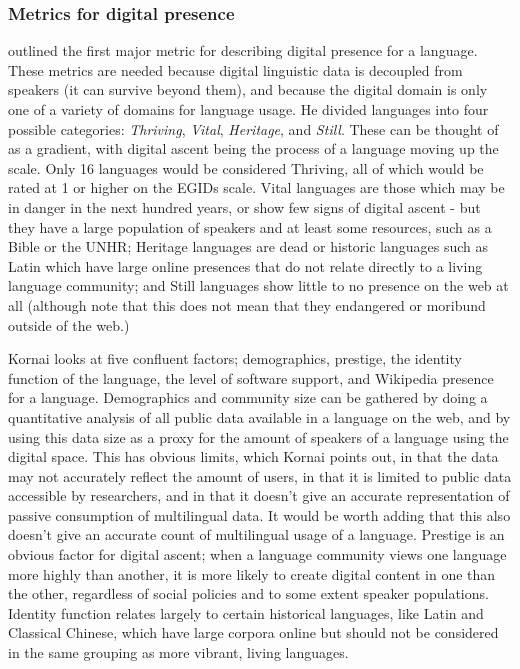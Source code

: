 \subsubsection{Metrics for digital presence}

\citet{kornai2013digital} outlined the first major metric for describing digital presence for a language. These metrics are needed because digital linguistic data is decoupled from speakers (it can survive beyond them), and because the digital domain is only one of a variety of domains for language usage. He divided languages into four possible categories: {\it Thriving}, {\it Vital}, {\it Heritage}, and {\it Still}. These can be thought of as a gradient, with digital ascent being the process of a language moving up the scale. Only 16 languages would be considered Thriving, all of which would be rated at 1 or higher on the EGIDs scale. Vital languages are those which may be in danger in the next hundred years, or show few signs of digital ascent - but they have a large population of speakers and at least some resources, such as a Bible or the UNHR; Heritage languages are dead or historic languages such as Latin which have large online presences that do not relate directly to a living language community; and Still languages show little to no presence on the web at all (although note that this does not mean that they endangered or moribund outside of the web.)

Kornai looks at five confluent factors; demographics, prestige, the identity function of the language, the level of software support, and Wikipedia presence for a language. Demographics and community size can be gathered by doing a quantitative analysis of all public data available in a language on the web, and by using this data size as a proxy for the amount of speakers of a language using the digital space. This has obvious limits, which Kornai points out, in that the data may not accurately reflect the amount of users, in that it is limited to public data accessible by researchers, and in that it doesn't give an accurate representation of passive consumption of multilingual data. It would be worth adding that this also doesn't give an accurate count of multilingual usage of a language. Prestige is an obvious factor for digital ascent; when a language community views one language more highly than another, it is more likely to create digital content in one than the other, regardless of social policies and to some extent speaker populations. Identity function relates largely to certain historical languages, like Latin and Classical Chinese, which have large corpora online but should not be considered in the same grouping as more vibrant, living languages.

